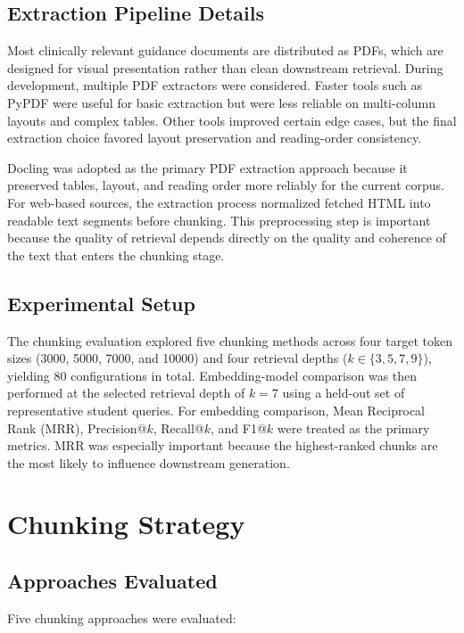 \documentclass[12pt]{article}
\begin{document}
\subsection{Extraction Pipeline Details}

Most clinically relevant guidance documents are distributed as PDFs, which are designed for visual presentation rather than clean downstream retrieval. During development, multiple PDF extractors were considered. Faster tools such as PyPDF were useful for basic extraction but were less reliable on multi-column layouts and complex tables. Other tools improved certain edge cases, but the final extraction choice favored layout preservation and reading-order consistency.

Docling was adopted as the primary PDF extraction approach because it preserved tables, layout, and reading order more reliably for the current corpus. For web-based sources, the extraction process normalized fetched HTML into readable text segments before chunking. This preprocessing step is important because the quality of retrieval depends directly on the quality and coherence of the text that enters the chunking stage.

\subsection{Experimental Setup}

The chunking evaluation explored five chunking methods across four target token sizes (3000, 5000, 7000, and 10000) and four retrieval depths ($k \in \{3,5,7,9\}$), yielding 80 configurations in total. Embedding-model comparison was then performed at the selected retrieval depth of $k=7$ using a held-out set of representative student queries. For embedding comparison, Mean Reciprocal Rank (MRR), Precision@$k$, Recall@$k$, and F1@$k$ were treated as the primary metrics. MRR was especially important because the highest-ranked chunks are the most likely to influence downstream generation.

\section{Chunking Strategy}

\subsection{Approaches Evaluated}

Five chunking approaches were evaluated:
\end{document}
